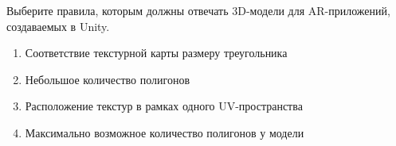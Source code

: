 
Выберите правила, которым должны отвечать 3D-модели для AR-приложений, создаваемых в Unity.

\begin{enumerate}
    \item Соответствие текстурной карты размеру треугольника
    \item Небольшое количество полигонов
    \item Расположение текстур в рамках одного UV-пространства
    \item Максимально возможное количество полигонов у модели
\end{enumerate}